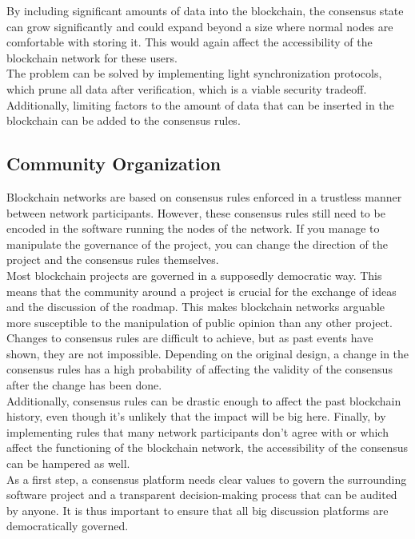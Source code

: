 \documentclass[12pt,a4paper]{article}
\begin{document}
By including significant amounts of data into the blockchain, the consensus state can grow significantly and could expand beyond a size where normal nodes are comfortable with storing it. This would again affect the accessibility of the blockchain network for these users.\\

The problem can be solved by implementing light synchronization protocols, which prune all data after verification, which is a viable security tradeoff. Additionally, limiting factors to the amount of data that can be inserted in the blockchain can be added to the consensus rules.\\

\subsection{Community Organization}

Blockchain networks are based on consensus rules enforced in a trustless manner between network participants. However, these consensus rules still need to be encoded in the software running the nodes of the network. If you manage to manipulate the governance of the project, you can change the direction of the project and the consensus rules themselves.\\

Most blockchain projects are governed in a supposedly democratic way. This means that the community around a project is crucial for the exchange of ideas and the discussion of the roadmap. This makes blockchain networks arguable more susceptible to the manipulation of public opinion than any other project.\\

Changes to consensus rules are difficult to achieve, but as past events have shown, they are not impossible. Depending on the original design, a change in the consensus rules has a high probability of affecting the validity of the consensus after the change has been done.\\

Additionally, consensus rules can be drastic enough to affect the past blockchain history, even though it's unlikely that the impact will be big here. Finally, by implementing rules that many network participants don't agree with or which affect the functioning of the blockchain network, the accessibility of the consensus can be hampered as well.\\

As a first step, a consensus platform needs clear values to govern the surrounding software project and a transparent decision-making process that can be audited by anyone. It is thus important to ensure that all big discussion platforms are democratically governed.\\
\end{document}
